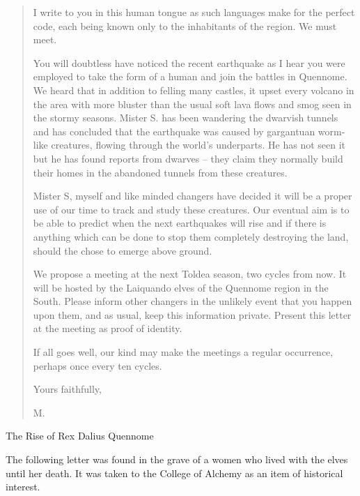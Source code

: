 \begin{quotation}

	I write to you in this human tongue as such languages make for the perfect code, each being known only to the inhabitants of the region.  We must meet.

	You will doubtless have noticed the recent earthquake as I hear you were employed to take the form of a human and join the battles in Quennome.  We heard that in addition to felling many castles, it upset every volcano in the area with more bluster than the usual soft lava flows and smog seen in the stormy seasons.  Mister S. has been wandering the dwarvish tunnels and has concluded that the earthquake was caused by gargantuan worm-like creatures, flowing through the world's underparts.  He has not seen it but he has found reports from dwarves -- they claim they normally build their homes in the abandoned tunnels from these creatures.

	Mister S, myself and like minded changers have decided it will be a proper use of our time to track and study these creatures.  Our eventual aim is to be able to predict when the next earthquakes will rise and if there is anything which can be done to stop them completely destroying the land, should the chose to emerge above ground.

	We propose a meeting at the next Toldea season, two cycles from now.  It will be hosted by the Laiquando elves of the Quennome region in the South.  Please inform other changers in the unlikely event that you happen upon them, and as usual, keep this information private.  Present this letter at the meeting as proof of identity.

	If all goes well, our kind may make the meetings a regular occurrence, perhaps once every ten cycles.

	Yours faithfully,

	M.
\end{quotation}

The Rise of Rex Dalius Quennome\label{h_dalius}

The following letter was found in the grave of a women who lived with the elves until her death.  It was taken to the College of Alchemy as an item of historical interest.

